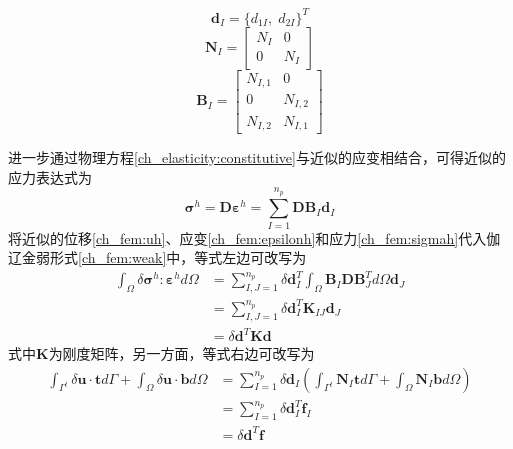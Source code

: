 \begin{itemize}
\begin{equation}
\boldsymbol d_I = \{d_{1I},\; d_{2I}\}^T
\end{equation}
\begin{equation}
\boldsymbol N_I = 
\begin{bmatrix}
        N_I & 0 \\
        0 & N_I
\end{bmatrix}
\end{equation}
\begin{equation}
\boldsymbol B_I = 
\begin{bmatrix}
        N_{I,1} & 0 \\
        0 & N_{I,2} \\
        N_{I,2} & N_{I,1}
\end{bmatrix}
\end{equation}
\end{itemize}\par
进一步通过物理方程\eqref{ch_elasticity:constitutive}与近似的应变相结合，可得近似的应力表达式为
\begin{equation}\label{ch_fem:sigmah}
\boldsymbol \sigma^h = \boldsymbol D \boldsymbol \varepsilon^h = \sum_{I=1}^{n_p}\boldsymbol D \boldsymbol B_I \boldsymbol d_I
\end{equation}
将近似的位移\eqref{ch_fem:uh}、应变\eqref{ch_fem:epsilonh}和应力\eqref{ch_fem:sigmah}代入伽辽金弱形式\eqref{ch_fem:weak}中，等式左边可改写为
\begin{equation}
\begin{split}
\int_{\Omega}\delta \boldsymbol \sigma^h : \boldsymbol \varepsilon^h d\Omega &= \sum_{I,J=1}^{n_p}\delta \boldsymbol d_I^T \int_{\Omega}\boldsymbol B_I \boldsymbol D \boldsymbol B_J^T d\Omega \boldsymbol d_J \\
&=\sum_{I,J=1}^{n_p}\delta \boldsymbol d_I^T \boldsymbol K_{IJ} \boldsymbol d_J \\
&= \delta \boldsymbol d^T \boldsymbol K \boldsymbol d
\end{split}
\end{equation}
式中$\boldsymbol K$为刚度矩阵，另一方面，等式右边可改写为
\begin{equation}
\begin{split}
\int_{\Gamma^t}\delta \boldsymbol u \cdot \boldsymbol t d\Gamma + \int_{\Omega} \delta \boldsymbol u \cdot \boldsymbol b d\Omega &= \sum_{I=1}^{n_p} \delta \boldsymbol d_I (\int_{\Gamma^t}\boldsymbol N_I \boldsymbol t d\Gamma + \int_{\Omega}\boldsymbol N_I \boldsymbol b d\Omega) \\
                                                                                                                                 &= \sum_{I=1}^{n_p} \delta \boldsymbol d^T_I \boldsymbol f_I \\
                                                                                                                                 &= \delta \boldsymbol d^T \boldsymbol f
\end{split}
\end{equation}

